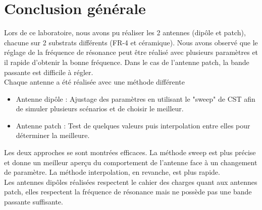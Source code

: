 \documentclass[Deriaz_Traiber_Labo02]{subfiles}
\begin{document}
\chapter{Conclusion générale}
Lors de ce laboratoire, nous avons pu réaliser les 2 antennes (dipôle et patch), chacune sur 2 substrats différents (FR-4 et céramique). Nous avons observé que le réglage de la fréquence de résonance peut être réalisé avec plusieurs paramètres et il rapide d'obtenir la bonne fréquence. Dans le cas de l'antenne patch, la bande passante est difficile à régler.\\
Chaque antenne a été réalisée avec une méthode différente
\begin{itemize}
\item Antenne dipôle : Ajustage des paramètres en utilisant le "sweep" de CST afin de simuler plusieurs scénarios et de choisir le meilleur.
\item Antenne patch : Test de quelques valeurs puis interpolation entre elles pour déterminer la meilleure.
\end{itemize}
Les deux approches se sont montrées efficaces. La méthode sweep est plus précise et donne un meilleur aperçu du comportement de l'antenne face à un changement de paramètre. La méthode interpolation, en revanche, est plus rapide.\\
Les antennes dipôles réalisées respectent le cahier des charges quant aux antennes patch, elles respectent la fréquence de résonance mais ne possède pas une bande passante suffisante.
\end{document}
